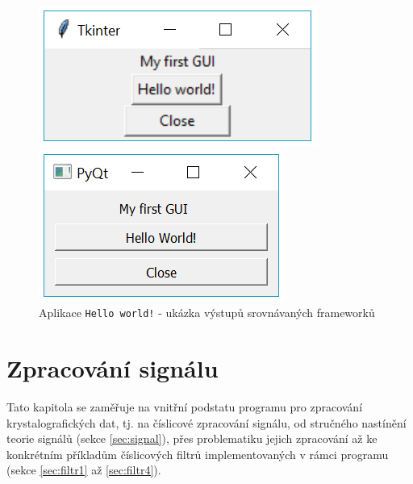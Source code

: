 \documentclass[a4paper, 12pt]{article}
\begin{document}
\begin{figure}[h!]
\centering
\begin{minipage}[b][4cm]{5cm}
  \centering
  \includegraphics[width=\linewidth]{tkinter_myfirstgui.png}\vspace{0.25cm}
\end{minipage}\hspace{1.5cm}
\begin{minipage}[b][4cm]{5cm}
  \centering
  \includegraphics[width=\linewidth]{pyqt_myfirstgui.png}\vspace{0.25cm}
\end{minipage}\vspace{0.4cm}
\caption{Aplikace \texttt{Hello world!} - ukázka výstupů srovnávaných frameworků}
\label{fig:myfirstgui}
\end{figure}

\newpage
\section{Zpracování signálu}
Tato kapitola se zaměřuje na vnitřní podstatu programu pro zpracování krystalografických dat, tj. na číslicové zpracování signálu, od stručného nastínění teorie signálů (sekce \ref{sec:signal}), přes problematiku jejich zpracování až ke konkrétním příkladům číslicových filtrů implementovaných v rámci programu (sekce \ref{sec:filtr1} až \ref{sec:filtr4}).
\end{document}
